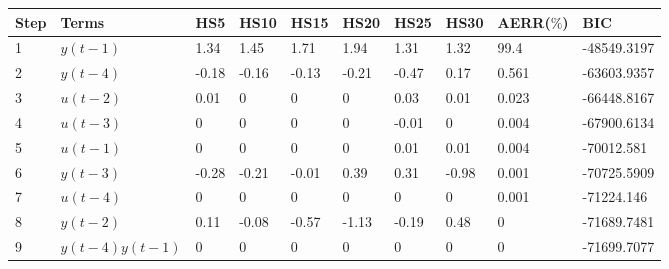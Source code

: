 \begin{tabular}{llllllllll}
Step & Terms & HS5 & HS10 & HS15 & HS20 & HS25 & HS30 & AERR($\%$) & BIC \\ 
\hline 
1 & $y(t-1)$ & 1.34 & 1.45 & 1.71 & 1.94 & 1.31 & 1.32 & 99.4 & -48549.3197 \\ 
2 & $y(t-4)$ & -0.18 & -0.16 & -0.13 & -0.21 & -0.47 & 0.17 & 0.561 & -63603.9357 \\ 
3 & $u(t-2)$ & 0.01 & 0 & 0 & 0 & 0.03 & 0.01 & 0.023 & -66448.8167 \\ 
4 & $u(t-3)$ & 0 & 0 & 0 & 0 & -0.01 & 0 & 0.004 & -67900.6134 \\ 
5 & $u(t-1)$ & 0 & 0 & 0 & 0 & 0.01 & 0.01 & 0.004 & -70012.581 \\ 
6 & $y(t-3)$ & -0.28 & -0.21 & -0.01 & 0.39 & 0.31 & -0.98 & 0.001 & -70725.5909 \\ 
7 & $u(t-4)$ & 0 & 0 & 0 & 0 & 0 & 0 & 0.001 & -71224.146 \\ 
8 & $y(t-2)$ & 0.11 & -0.08 & -0.57 & -1.13 & -0.19 & 0.48 & 0 & -71689.7481 \\ 
9 & $y(t-4)y(t-1)$ & 0 & 0 & 0 & 0 & 0 & 0 & 0 & -71699.7077 \\ 
\hline 
\end{tabular}